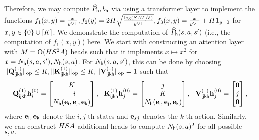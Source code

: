 Therefore, we may compute $\widehat{P}_{\mathsf{h}},{b}_{\mathsf{h}}$ via using a transformer layer  to implement the functions $f_1(x,y)=\frac{x}{y\vee1},f_2(y)=2{H}\sqrt{\frac{\log({S}{A}{T}/\delta)}{y\vee 1}},f_3(x,y)=\frac{x}{y\vee1}+{H}{\mathbf 1}_{y=0}$ for $x,y\in\{0\}\cup[{K}]$.
We demonstrate the computation of $\widehat{P}_{\mathsf{h}}({s},{a},{s}')$  (i.e., the computation of $f_1(x,y)$) here. We start with constructing an attention layer with ${M}={\mathrm{O}}({H}{S}^2{A})$ heads such that it implements  $x\mapsto x^2$ for $x={N}_{\mathsf{h}}({s},{a},{s}'),{N}_{\mathsf{h}}({s},{a})$. For ${N}_{\mathsf{h}}({s},{a},{s}')$, this can be done by  choosing  $\|{{\mathbf Q}_{{\mathsf{i}}{\mathsf{j}}{\mathsf{k}}{\mathsf{h}}}^{(1)}}\|_{\mathrm{op}}\leq{K},\|{{\mathbf K}_{{\mathsf{i}}{\mathsf{j}}{\mathsf{k}}{\mathsf{h}}}^{(1)}}\|_{\mathrm{op}}\leq{K},\|{{\mathbf V}_{{\mathsf{i}}{\mathsf{j}}{\mathsf{k}}{\mathsf{h}}}^{(1)}}\|_{\mathrm{op}}=1$ such that
\begin{align*}
    {\mathbf Q}_{{\mathsf{i}}{\mathsf{j}}{\mathsf{k}}{\mathsf{h}}}^{(1)}{\mathbf h}_i^{(0)}=\begin{bmatrix}
        {K}\\
        -i\\
        {N}_{\mathsf{h}}({\mathbf e}_{\mathsf{i}},{\mathbf e}_{\mathsf{j}},{\mathbf e}_{\mathsf{k}})
    \end{bmatrix},~~{\mathbf K}_{{\mathsf{i}}{\mathsf{j}}{\mathsf{k}}{\mathsf{h}}}^{(1)}{\mathbf h}_j^{(0)}=\begin{bmatrix}
        j\\ {K}\\
        {N}_{\mathsf{h}}({\mathbf e}_{\mathsf{i}},{\mathbf e}_{\mathsf{j}},{\mathbf e}_{\mathsf{k}})
    \end{bmatrix},~~
    {\mathbf V}_{{\mathsf{i}}{\mathsf{j}}{\mathsf{k}}{\mathsf{h}}}^{(1)}{\mathbf h}_j^{(0)}=\begin{bmatrix}
        {\mathbf 0}\\j\\{\mathbf 0}
    \end{bmatrix},
\end{align*} where ${\mathbf e}_{\mathsf{i}},{\mathbf e}_{\mathsf{k}}$ denote the $i,j$-th states and ${\mathbf e}_{sj}$ denotes the $k$-th action.
Similarly, we can construct ${H}{S}{A}$ additional heads
to compute ${N}_{\mathsf{h}}({s},{a})^2$ for all possible ${s},{a}.$

